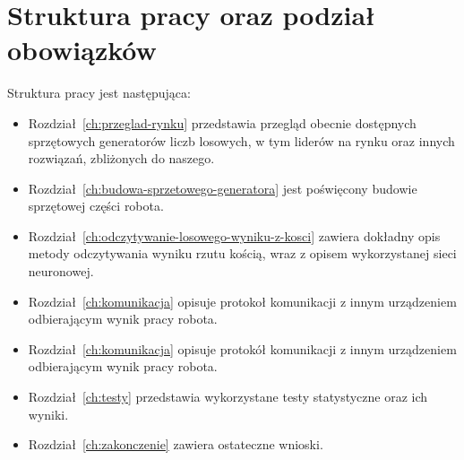 \section{Struktura pracy oraz podział obowiązków}\label{sec:struktura-pracy-oraz-podzia-obowiazkow}

Struktura pracy jest następująca:
\begin{itemize}
    \item Rozdział~\ref{ch:przeglad-rynku} przedstawia przegląd obecnie dostępnych sprzętowych generatorów liczb losowych,
    w tym liderów na rynku oraz innych rozwiązań, zbliżonych do naszego.
    \item Rozdział~\ref{ch:budowa-sprzetowego-generatora} jest poświęcony budowie sprzętowej części robota.
    \item Rozdział~\ref{ch:odczytywanie-losowego-wyniku-z-kosci} zawiera dokładny opis metody odczytywania wyniku rzutu kością,
    wraz z opisem wykorzystanej sieci neuronowej.
    \item Rozdział~\ref{ch:komunikacja} opisuje protokoł komunikacji z innym urządzeniem odbierającym wynik pracy robota. 
    \item Rozdział~\ref{ch:komunikacja} opisuje protokół komunikacji z innym urządzeniem odbierającym wynik pracy robota.
    \item Rozdział~\ref{ch:testy} przedstawia wykorzystane testy statystyczne oraz ich wyniki.
    \item Rozdział~\ref{ch:zakonczenie} zawiera ostateczne wnioski.
\end{itemize}

